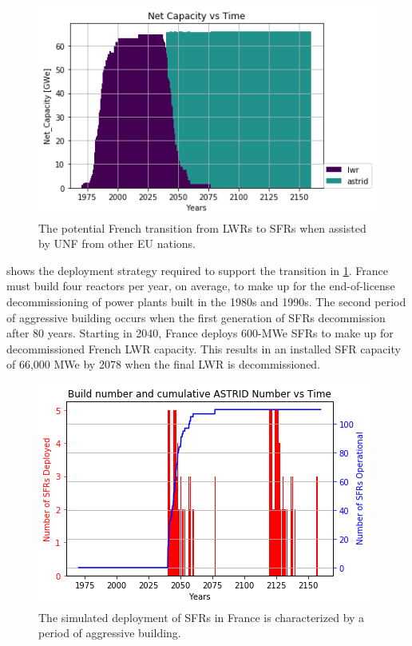 \begin{figure}[htbp!]
        \begin{center}
                \includegraphics[scale=0.7]{./images/french-transition/power_plot.png}
        \end{center}
        \caption{The potential French transition from \glspl{LWR} to 
                \glspl{SFR} when assisted by \gls{UNF} from other \gls{EU} 
        nations.}
        \label{fig:sfr_num}
\end{figure}


 shows the deployment strategy required to support the transition in 
\cref{fig:sfr_num}. France must build four reactors per year, on average, to 
make up for the end-of-license decommissioning of power plants built in the 1980s and 1990s.  The second period of aggressive building occurs when the first generation of \glspl{SFR} decommission after 80 years. Starting in 2040, France deploys 600-\gls{MWe} \glspl{SFR} to make up for 
decommissioned French \gls{LWR} capacity. This results in an installed 
\gls{SFR} 
capacity of 66,000 \gls{MWe} by 2078 when the final \gls{LWR} is 
decommissioned. 



\begin{figure}[htbp!]
    \begin{center}
        \includegraphics[scale=0.7]{./images/french-transition/sfr_deploy.png}
    \end{center}
    \caption{The simulated deployment of \glspl{SFR} in France is characterized by a period of
    aggressive building.}
    \label{fig:french_dep}
\end{figure}


